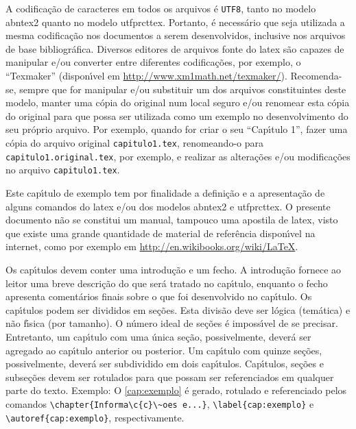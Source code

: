 A codifica\c{c}\~ao de caracteres em todos os arquivos \'e \texttt{UTF8}, tanto no modelo \gls{abntex2} quanto no modelo \gls{utfprcttex}. Portanto, \'e necess\'ario que seja utilizada a mesma codifica\c{c}\~ao nos documentos a serem desenvolvidos, inclusive nos arquivos de base bibliogr\'afica. Diversos editores de arquivos fonte do \gls{latex} s\~ao capazes de manipular e/ou converter entre diferentes codifica\c{c}\~oes, por exemplo, o ``Texmaker'' (dispon\'{\i}vel em \url{http://www.xm1math.net/texmaker/}). Recomenda-se, sempre que for manipular e/ou substituir um dos arquivos constituintes deste modelo, manter uma c\'opia do original num local seguro e/ou renomear esta c\'opia do original para que possa ser utilizada como um exemplo no desenvolvimento do seu pr\'oprio arquivo. Por exemplo, quando for criar o seu ``Cap\'{\i}tulo 1'', fazer uma c\'opia do arquivo original \texttt{capitulo1.tex}, renomeando-o para \texttt{capitulo1.original.tex}, por exemplo, e realizar as altera\c{c}\~oes e/ou modifica\c{c}\~oes no arquivo \texttt{capitulo1.tex}.

Este cap\'{\i}tulo\label{errata:capitulo} de exemplo tem por finalidade a defini\c{c}\~ao e a apresenta\c{c}\~ao de alguns comandos do \gls{latex} e/ou dos modelos \gls{abntex2} e \gls{utfprcttex}. O presente documento n\~ao se constitui um manual, tampouco uma apostila de \gls{latex}, visto que existe uma grande quantidade de material de refer\^encia dispon\'{\i}vel na internet, como por exemplo em \url{http://en.wikibooks.org/wiki/LaTeX}.

Os cap\'{\i}tulos devem conter uma introdu\c{c}\~ao e um fecho. A introdu\c{c}\~ao fornece ao leitor uma breve descri\c{c}\~ao do que ser\'a tratado no cap\'{\i}tulo, enquanto o fecho apresenta coment\'arios finais sobre o que foi desenvolvido no cap\'{\i}tulo. Os cap\'{\i}tulos podem ser divididos em se\c{c}\~oes\label{errata:secao}. Esta divis\~ao deve ser l\'ogica (tem\'atica) e n\~ao f\'{\i}sica (por tamanho). O n\'umero ideal de se\c{c}\~oes \'e imposs\'{\i}vel de se precisar. Entretanto, um cap\'{\i}tulo com uma \'unica se\c{c}\~ao, possivelmente, dever\'a ser agregado ao cap\'{\i}tulo anterior ou posterior. Um cap\'{\i}tulo com quinze se\c{c}\~oes, possivelmente, dever\'a ser subdividido em dois cap\'{\i}tulos. Cap\'{\i}tulos, se\c{c}\~oes e subse\c{c}\~oes\label{errata:subsecao} devem ser rotulados para que possam ser referenciados em qualquer parte do texto. Exemplo: O \autoref{cap:exemplo} \'e gerado, rotulado e referenciado pelos comandos \verb|\chapter{Informa\c{c}\~oes e...}|, \verb|\label{cap:exemplo}| e \verb|\autoref{cap:exemplo}|, respectivamente.

